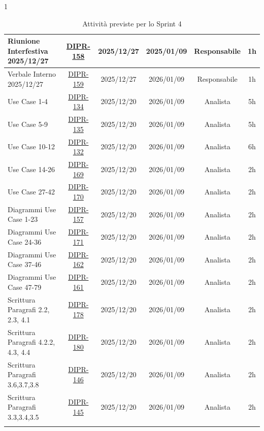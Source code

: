 \documentclass[a4paper,12pt]{article}
\begin{document}
\begin{spacing}{1}
\begin{longtable}{|p{4cm}|c|c|c|c|c|}
        Riunione Interfestiva 2025/12/27 & \href{https://7zpus.atlassian.net/browse/DIPR-158}{DIPR-158} & 2025/12/27 & 2025/01/09 & Responsabile & 1h \\
        \hline
        Verbale Interno 2025/12/27 & \href{https://7zpus.atlassian.net/browse/DIPR-159}{DIPR-159} & 2025/12/27 & 2026/01/09 & Responsabile & 1h \\


        \hline
        Use Case 1-4 & \href{https://7zpus.atlassian.net/browse/DIPR-134}{DIPR-134} & 2025/12/20 & 2026/01/09 & Analista & 5h\\
        \hline
        Use Case 5-9 & \href{https://7zpus.atlassian.net/browse/DIPR-135}{DIPR-135} & 2025/12/20 & 2026/01/09 & Analista & 5h\\
        \hline
        Use Case 10-12 & \href{https://7zpus.atlassian.net/browse/DIPR-132}{DIPR-132} & 2025/12/20 & 2026/01/09 & Analista & 6h\\
        \hline        
        Use Case 14-26& \href{https://7zpus.atlassian.net/browse/DIPR-169}{DIPR-169} & 2025/12/20 & 2026/01/09 & Analista & 2h \\
        \hline
        Use Case 27-42& \href{https://7zpus.atlassian.net/browse/DIPR-170}{DIPR-170} & 2025/12/20 & 2026/01/09 & Analista & 2h \\
        \hline
        Diagrammi Use Case 1-23 & \href{https://7zpus.atlassian.net/browse/DIPR-157}{DIPR-157} & 2025/12/20 & 2026/01/09 & Analista & 2h \\
        \hline
        Diagrammi Use Case 24-36 & \href{https://7zpus.atlassian.net/browse/DIPR-171}{DIPR-171} & 2025/12/20 & 2026/01/09 & Analista & 2h \\
        \hline
        Diagrammi Use Case 37-46 & \href{https://7zpus.atlassian.net/browse/DIPR-162}{DIPR-162} & 2025/12/20 & 2026/01/09 & Analista & 2h \\
        \hline
        Diagrammi Use Case 47-79& \href{https://7zpus.atlassian.net/browse/DIPR-161}{DIPR-161} & 2025/12/20 & 2026/01/09 & Analista & 2h \\
        \hline
        Scrittura Paragrafi 2.2, 2.3, 4.1 & \href{https://7zpus.atlassian.net/browse/DIPR-178}{DIPR-178} & 2025/12/20 & 2026/01/09 & Analista & 2h \\
        \hline
        Scrittura Paragrafi 4.2.2, 4.3, 4.4 & \href{https://7zpus.atlassian.net/browse/DIPR-180}{DIPR-180} & 2025/12/20 & 2026/01/09 & Analista & 2h \\
        \hline
        Scrittura Paragrafi 3.6,3.7,3.8& \href{https://7zpus.atlassian.net/browse/DIPR-146}{DIPR-146} & 2025/12/20 & 2026/01/09 & Analista & 2h \\
        \hline
        Scrittura Paragrafi 3.3,3.4,3.5 & \href{https://7zpus.atlassian.net/browse/DIPR-145}{DIPR-145} & 2025/12/20 & 2026/01/09 & Analista & 2h \\
        \hline
        \caption{Attività previste per lo Sprint 4}

    \end{longtable}

    \end{spacing}
\end{document}
